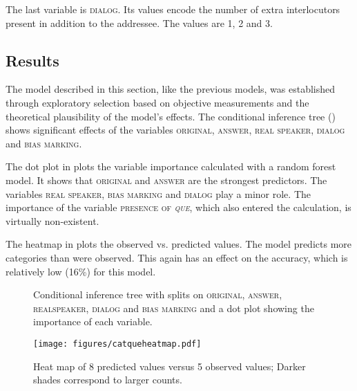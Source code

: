The last variable is \textsc{dialog}. Its values encode the number of extra interlocutors present  in addition to the addressee. The values are 1, 2 and 3.


\subsection{Results}

The model described in this section, like the previous models, was established through exploratory selection based on objective measurements and the theoretical plausibility of the model's effects. The conditional inference tree () shows significant effects of the variables \textsc{original}, \textsc{answer}, \textsc{real speaker}, \textsc{dialog} and \textsc{bias marking}.  

The dot plot in  plots the variable importance calculated with a random forest model. It shows that \textsc{original} and \textsc{answer} are the strongest predictors.  The variables \textsc{real speaker}, \textsc{bias marking} and \textsc{dialog} play a minor role. The importance of the variable \textsc{presence of \emph{que}}, which also entered the calculation, is virtually non-existent. 


The heatmap in  plots the observed vs. predicted values. The model predicts more categories than were observed.  This again has  an effect on the accuracy, which is relatively low (16\%) for this model.

\begin{figure}[ph]
	\caption{Conditional inference tree with splits on \textsc{original}, \textsc{answer}, \textsc{realspeaker}, \textsc{dialog} and \textsc{bias marking} and a dot plot showing the importance of each variable.}
\end{figure}

\begin{figure}[h]
	\centering
	\texttt{[image: figures/catqueheatmap.pdf]}
	\caption{Heat map of  8 predicted values versus 5 observed values; Darker  shades  correspond to
		larger counts.\label{fig:biasheatmap}}
\end{figure}

